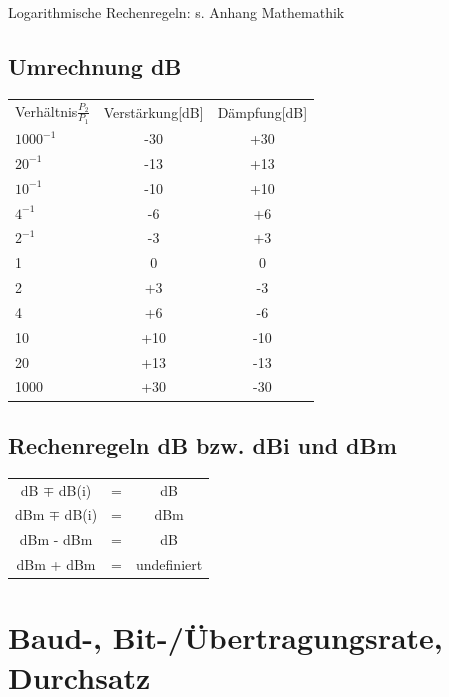 \documentclass[fs, footer]{latex4ei}
\begin{document}
\begin{multicols*}{4}
{Logarithmische Rechenregeln: s. Anhang Mathemathik \\


	\subsection{Umrechnung dB}
\begin{tabular}[h]{l|c|c}
	Verhältnis$\frac{P_2}{P_1}$ & Verstärkung[dB] & Dämpfung[dB] \\
	$ 1000^{-1}$ & -30 & +30 \\
	$ 20^{-1} $ & -13 & +13 \\
	$ 10^{-1} $ & -10 & +10 \\ 
	$ 4^{-1} $ & -6 & +6 \\
	$ 2^{-1} $ & -3 & +3 \\
	1 & 0 & 0 \\
	2 & +3 & -3 \\
	4 & +6 & -6 \\
	10 & +10 & -10\\
	20 & +13 & -13 \\
	1000 & +30 & -30  
\end{tabular}

	\subsection{Rechenregeln dB bzw. dBi und dBm}
\begin{tabular}[h]{c c c}
	dB $\mp$ dB(i) 	& = & dB  \\
	dBm $\mp$ dB(i) 	& = & dBm  \\
	dBm - dBm 		& = & dB  \\
	dBm + dBm 		& = & undefiniert
\end{tabular}
}


\section{Baud-, Bit-/Übertragungsrate, Durchsatz}
\end{multicols*}
\end{document}

